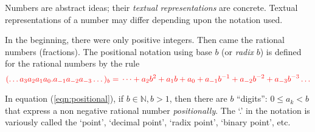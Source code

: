 Numbers are abstract ideas; their \textit{textual representations} are concrete. Textual representations of a number may differ depending upon the notation used.

In the beginning, there were only positive integers. Then came the rational numbers (fractions). The positional notation using base $b$ (or \textit{radix} $b$) is defined for the rational numbers by the rule
\begin{equation} \label{eqn:positional}
\mathcolor{red}
{
(\dots a_{3}a_{2}a_{1}a_{0}.a_{-1}a_{-2}a_{-3}\dots)_{b} = \\
\dots +a_{2}b^{2}+a_{1}b+a_{0}+a_{-1}b^{-1}+a_{-2}b^{-2}+a_{-3}b^{-3}\dots
}
\end{equation}

In equation (\ref{eqn:positional}), if $b \in \mathbb{N}, b > 1$, then there are $b$ ``digits'': $0\le a_k < b$ that express a non negative rational number \textit{positionally}. The `.' in the notation is variously called the `point', `decimal point', `radix point', `binary point', etc.

